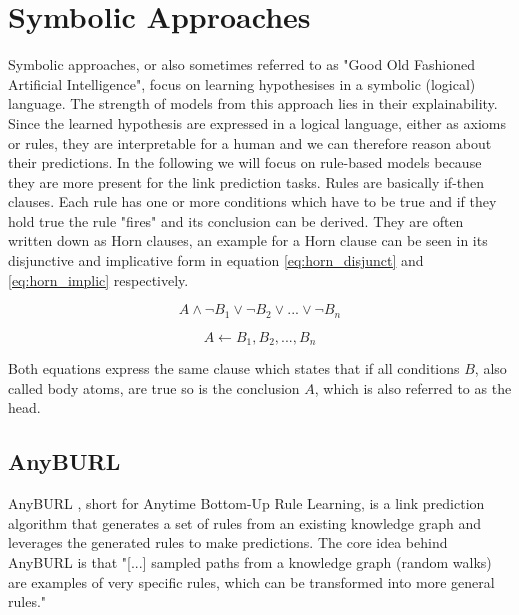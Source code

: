 \section{Symbolic Approaches}
\label{cha:symbolic_methods}
Symbolic approaches, or also sometimes referred to as "Good Old Fashioned Artificial Intelligence", focus on learning hypothesises in a symbolic (logical) language. \cite{hogan_knowledge_2021} The strength of models from this approach lies in their explainability. Since the learned hypothesis are expressed in a logical language, either as axioms or rules, they are interpretable for a human and we can therefore reason about their predictions. In the following we will focus on rule-based models because they are more present for the link prediction tasks.  \cite{hatzilygeroudis_neuro-symbolic_2005} 
Rules are basically if-then clauses. Each rule has one or more conditions which have to be true and if they hold true the rule "fires" and its conclusion can be derived. They are often written down as Horn clauses, an example for a Horn clause can be seen in its disjunctive and implicative form in equation \ref{eq:horn_disjunct} and \ref{eq:horn_implic} respectively. \cite{chandra_horn_1985}

\begin{equation}
\label{eq:horn_disjunct}
A \wedge \neg B_1 \vee \neg B_2 \vee ... \vee \neg B_n \end{equation}

\begin{equation}
\label{eq:horn_implic}
A \leftarrow B_1, B_2, ..., B_n
\end{equation}

Both equations express the same clause which states that if all conditions $B$, also called body atoms, are true so is the conclusion $A$, which is also referred to as the head.

\subsection{AnyBURL}
\label{cha:anyburl}
AnyBURL \cite{meilicke_anytime_2019}, short for Anytime Bottom-Up Rule Learning, is a link prediction algorithm that generates a set of rules from an existing knowledge graph and leverages the generated rules to make predictions. The core idea behind AnyBURL  is that "[...] sampled paths from a knowledge graph (random walks) are examples of very specific rules, which can be transformed into more general rules." \cite{ott_safran_2021} 

